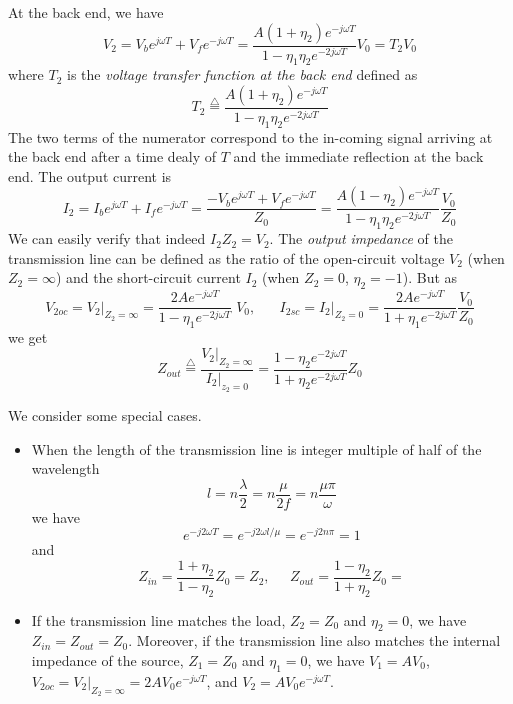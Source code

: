 At the back end, we have
\[  V_2=V_be^{j\omega T}+V_fe^{-j\omega T}
=\frac{A(1+\eta_2)e^{-j\omega T}}{1-\eta_1\eta_2e^{-2j\omega T}}V_0 = T_2V_0 \]
where $T_2$ is the {\em voltage transfer function at the back end} defined as
\[ T_2\stackrel{\triangle}{=}\frac{A(1+\eta_2)e^{-j\omega T}}{1-\eta_1\eta_2e^{-2j\omega T}}	\]
The two terms of the numerator correspond to the in-coming signal arriving at
the back end after a time dealy of $T$ and the immediate reflection at the back
end. The output current is
\[  I_2=I_be^{j\omega T}+I_fe^{-j\omega T}=\frac{-V_be^{j\omega T}+V_fe^{-j\omega T}}{Z_0}
=\frac{A(1-\eta_2)e^{-j\omega T}}{1-\eta_1\eta_2e^{-2j\omega T}} \frac{V_0}{Z_0}	\]
We can easily verify that indeed $I_2Z_2=V_2$.
The {\em output impedance} of the transmission line can be defined as the ratio 
of the open-circuit voltage $V_2$ (when $Z_2=\infty$) and the short-circuit current
$I_2$ (when $Z_2=0$, $\eta_2=-1$). But as
\[ V_{2oc}=V_2\big|_{Z_2=\infty}=\frac{2Ae^{-j\omega T}}{1-\eta_1e^{-2j\omega T}}\;V_0,\;\;\;\;\;\;
   I_{2sc}=I_2\big|_{Z_2=0}=\frac{2Ae^{-j\omega T}}{1+\eta_1e^{-2j\omega T}}\frac{V_0}{Z_0}
\]
we get
\[ Z_{out}\stackrel{\triangle}{=}\frac{V_2\big|_{Z_2=\infty}}{I_2\big|_{z_2=0}}
=\frac{1-\eta_2e^{-2j\omega T}}{1+\eta_2e^{-2j\omega T}} Z_0 \]


We consider some special cases.

\begin{itemize}
\item When the length of the transmission line is integer multiple of half of
  the wavelength
  \[ l=n\frac{\lambda}{2}=n\frac{\mu}{2f}=n\frac{\mu\pi}{\omega}  \]
  we have
  \[ e^{-j2\omega T}=e^{-j2\omega l/\mu}=e^{-j2n\pi}=1 \]
  and
  \[ Z_{in}=\frac{1+\eta_2}{1-\eta_2}Z_0=Z_2,\;\;\;\;\;
  Z_{out}=\frac{1-\eta_2}{1+\eta_2}Z_0= \]

\item If the transmission line matches the load, $Z_2=Z_0$ and $\eta_2=0$,
  we have $Z_{in}=Z_{out}=Z_0$. Moreover, if the transmission line also matches the
  internal impedance of the source, $Z_1=Z_0$ and $\eta_1=0$, we have $V_1=AV_0$,
  $V_{2oc}=V_2\big|_{Z_2=\infty}=2AV_0 e^{-j\omega T}$, and $V_2=AV_0e^{-j\omega T}$.
\end{itemize}

